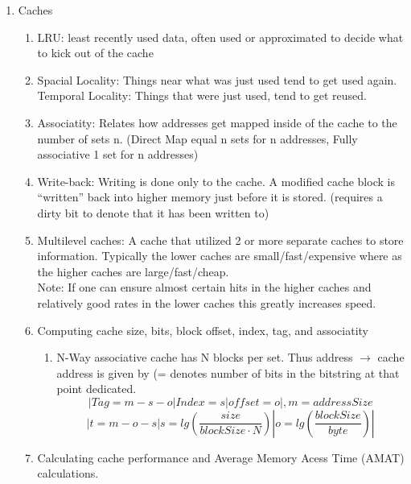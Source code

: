 \documentclass[12pt]{article}
\renewcommand{\=}[1]{\stackrel{#1}{=}} %
\theoremstyle{definition}
\theoremstyle{remark}
\begin{document}
  \begin{enumerate}

  \item Caches
    \begin{enumerate}
    \item LRU: least recently used data, often used or approximated to
      decide what to kick out of the cache
    \item
      Spacial Locality: Things near what was just used tend to get used
      again.\\
      Temporal Locality: Things that were just used, tend to get reused.
    \item Associatity: Relates how addresses get mapped inside of
      the cache to the number of sets n. (Direct Map equal n sets for
      n addresses, Fully associative 1 set for n addresses)
    \item Write-back: Writing is done only to the cache. A modified
      cache block is ``written'' back into higher memory just before
      it is stored. (requires a dirty bit to denote that it has been
      written to)
    \item Multilevel caches: A cache that utilized 2 or more separate
      caches to store information. Typically the lower caches are
      small/fast/expensive where as the higher caches are
      large/fast/cheap.\\
      Note: If one can ensure almost certain hits in the higher caches
      and relatively good rates in the lower caches this greatly
      increases speed.
    \item Computing cache size, bits, block offset, index, tag, and associatity
      \begin{enumerate}
      \item N-Way associative cache has N blocks per set. Thus
        address $\rightarrow$ cache address is given by (= denotes
        number of bits in the bitstring at that point dedicated.
        \begin{equation}
          |Tag=m-s-o|Index=s|offset=o|, m = addressSize
        \end{equation}
        \begin{equation}
          |t = m-o-s | s = lg(\frac{size}{blockSize\cdot N})|o = lg(\frac{blockSize}{byte})|
        \end{equation}
      \end{enumerate}
    \item Calculating cache performance and Average Memory Acess Time (AMAT) calculations.
      \begin{enumerate}

\end{enumerate}
\end{enumerate}
\end{enumerate}
\end{document}

